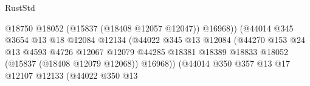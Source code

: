 \begin{lexlean}{RustStd}
\begin{coremodule}
{\begin{coremodule}
{{{{{{{{{{{{{{{{{{{{{{{{{{{{{{{{{{{{{{{{{{{{{{{{{{{{{{{{{{{{                                                          @18750
                                                          @18052
                                                          (@15837 (@18408 @12057 @12047))
                                                          @16968))
                                                      (@44014
                                                        @345
                                                        @3654
                                                        @13
                                                        @18
                                                        @12084
                                                        @12134
                                                        (@44022
                                                          @345
                                                          @13
                                                          @12084
                                                          (@44270
                                                            @153
                                                            @24
                                                            @13
                                                            @4593
                                                            @4726
                                                            @12067
                                                            @12079
                                                            @44285
                                                            @18381
                                                            @18389
                                                            @18833
                                                            @18052
                                                            (@15837 (@18408 @12079 @12068))
                                                            @16968))
                                                        (@44014
                                                          @350
                                                          @357
                                                          @13
                                                          @17
                                                          @12107
                                                          @12133
                                                          (@44022
                                                            @350
                                                            @13
}}}}}}}}}}}}}}}}}}}}}}}}}}}}}}}}}}}}}}}}}}}}}}}}}}}}}}}}}}}}
\end{coremodule}}
\end{coremodule}
\end{lexlean}
